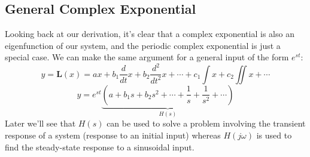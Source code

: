 \subsection{General Complex Exponential}
Looking back at our derivation, it's clear that a complex exponential is also an eigenfunction of our system, and the periodic complex exponential is just a special case.  We can make the same argument for a general input of the form $e^{st}$:
    \begin{equation}
        y = \mathbf{L}(x) = a x + b_1 \frac{d}{dt} x + b_2\frac{d^2}{dt^2} x + \cdots + c_1 \int x + c_2 \iint x + \cdots
    \end{equation}
    \begin{equation}
        y =  e^{s t} \underbrace{\left(a + b_1 s  + b_2 s^2  + \cdots + \frac{1}{ s} + \frac{1}{ s^2} + \cdots \right)}_{H(s)}
    \end{equation}
Later we'll see that $H(s)$ can be used to solve a problem involving the transient response of a system (response to an initial input) whereas $H(j\omega)$ is used to find the steady-state response to a sinusoidal input.
